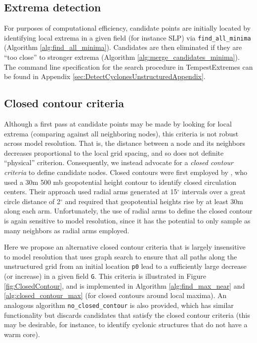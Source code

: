 \documentclass[gmdd, hvmath, online]{copernicus_discussions}
\begin{document}
\subsection{Extrema detection}

For purposes of computational efficiency, candidate points are initially located by identifying local extrema in a given field (for instance SLP) via \texttt{find\_all\_minima} (Algorithm \ref{alg:find_all_minima}).  Candidates are then eliminated if they are ``too close'' to stronger extrema (Algorithm \ref{alg:merge_candidates_minima}).  The command line specification for the search procedure in TempestExtremes can be found in Appendix \ref{sec:DetectCyclonesUnstructuredAppendix}.


\subsection{Closed contour criteria}

Although a first pass at candidate points may be made by looking for local extrema (comparing against all neighboring nodes), this criteria is not robust across model resolution.  That is, the distance between a node and its neighbors decreases proportional to the local grid spacing, and so does not definite ``physical'' criterion.  Consequently, we instead advocate for a \textit{closed contour criteria} to define candidate nodes.  Closed contours were first employed by \cite{bell198915}, who used a 30m 500 mb geopotential height contour to identify closed circulation centers.  Their approach used radial arms generated at 15$^\circ$ intervals over a great circle distance of 2$^\circ$ and required that geopotential heights rise by at least 30m along each arm.  Unfortunately, the use of radial arms to define the closed contour is again sensitive to model resolution, since it has the potential to only sample as many neighbors as radial arms employed.

Here we propose an alternative closed contour criteria that is largely insensitive to model resolution that uses graph search to ensure that all paths along the unstructured grid from an initial location \texttt{p0} lead to a sufficiently large decrease (or increase) in a given field \texttt{G}.  This criteria is illustrated in Figure \ref{fig:ClosedContour}, and is implemented in Algorithm \ref{alg:find_max_near} and \ref{alg:closed_contour_max} (for closed contours around local maxima).  An analogous algorithm \texttt{no\_closed\_contour} is also provided, which has similar functionality but discards candidates that satisfy the closed contour criteria (this may be desirable, for instance, to identify cyclonic structures that do not have a warm core).
\end{document}
